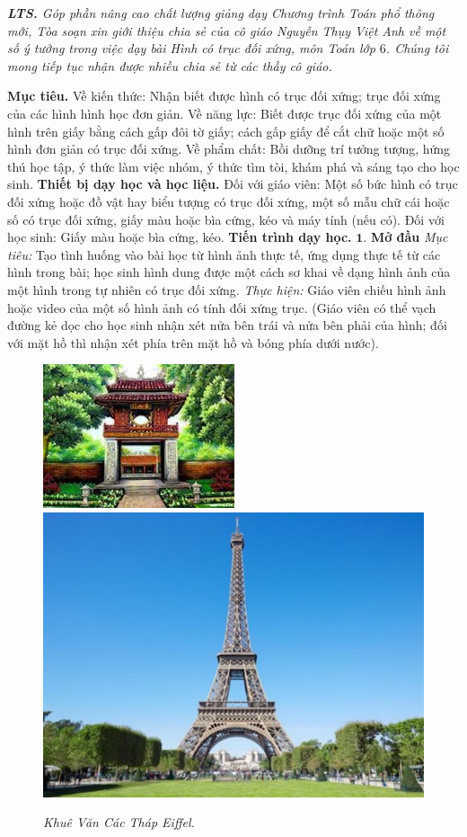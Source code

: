	\textit{\textbf{\color{diendantoanhoc}LTS.} Góp phần nâng cao chất lượng giảng dạy Chương trình Toán phổ thông mới, Tòa soạn xin giới thiệu chia sẻ của cô giáo Nguyễn Thụy Việt Anh về một số ý tưởng trong việc dạy bài Hình có trục đối xứng, môn Toán lớp $6$. Chúng tôi mong tiếp tục nhận được nhiều chia sẻ từ các thầy \linebreak cô giáo.}
\begin{multicols}{2}
	\textbf{\color{diendantoanhoc}Mục tiêu.} Về kiến thức:  Nhận biết được hình có trục đối xứng; trục đối xứng của các hình hình học đơn giản.  Về năng lực: Biết được trục đối xứng của một hình trên giấy bằng cách gấp đôi tờ giấy; cách gấp giấy để cắt chữ hoặc một số hình đơn giản có trục đối xứng. Về phẩm chất: Bồi dưỡng trí tưởng tượng, hứng thú học tập, ý thức làm việc nhóm, ý thức tìm tòi, khám phá và sáng tạo cho học sinh.
	\vskip 0.1cm
	\textbf{\color{diendantoanhoc}Thiết bị dạy học và học liệu.} Đối với giáo viên: Một số bức hình có trục đối xứng hoặc đồ vật hay biểu tượng có trục đối xứng, một số mẫu chữ cái hoặc số có trục đối xứng, giấy màu hoặc bìa cứng, kéo và máy tính (nếu có). Đối với học sinh: Giấy màu hoặc bìa cứng, kéo.
	\vskip 0.1cm
	\textbf{\color{diendantoanhoc}Tiến trình dạy học.}
	\vskip 0.1cm  
	$\pmb{1.}$ \textbf{\color{diendantoanhoc}Mở đầu}
	\vskip 0.1cm
	\textit{Mục tiêu:} Tạo tình huống vào bài học từ hình ảnh thực tế, ứng dụng thực tế từ các hình trong bài; học sinh hình dung được một cách sơ khai về dạng hình ảnh của một hình trong tự nhiên có trục đối xứng.
	\vskip 0.1cm
	\textit{Thực hiện:} Giáo viên chiếu hình ảnh hoặc video của một số hình ảnh có tính đối xứng trục. (Giáo viên có thể vạch đường kẻ dọc cho học sinh nhận xét nửa bên trái và nửa bên phải của hình; đối với mặt hồ thì nhận xét phía trên mặt hồ và bóng phía dưới nước). 
	\begin{figure}[H]
		\vspace*{-5pt}
		\centering
		\captionsetup{labelformat= empty, justification=centering}
		\includegraphics[height=0.37\linewidth]{1}
		\includegraphics[height=0.37\linewidth]{2}
		\caption{\small\textit{\color{diendantoanhoc}Khuê Văn Các \hspace*{45pt} Tháp Eiffel.}}
		

\end{figure}
\end{multicols}
